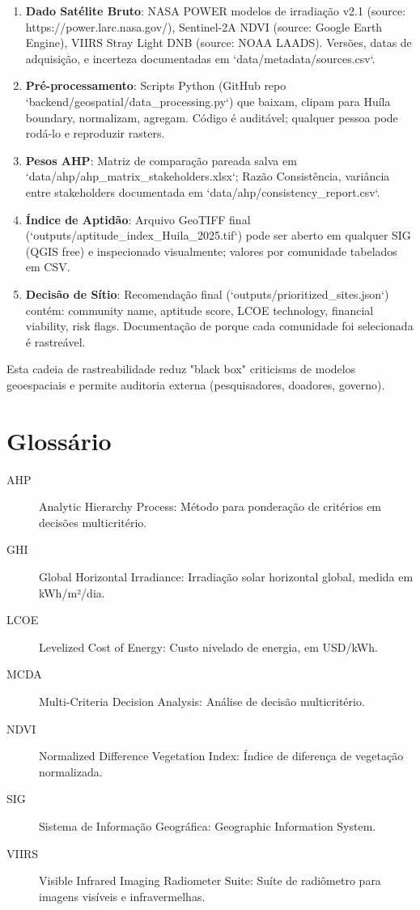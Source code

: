 \documentclass[12pt, a4paper]{article}
\begin{document}
\begin{enumerate}
\item \textbf{Dado Satélite Bruto}: NASA POWER modelos de irradiação v2.1 (source: https://power.larc.nasa.gov/), Sentinel-2A NDVI (source: Google Earth Engine), VIIRS Stray Light DNB (source: NOAA LAADS). Versões, datas de adquisição, e incerteza documentadas em `data/metadata/sources.csv`.

\item \textbf{Pré-processamento}: Scripts Python (GitHub repo `backend/geospatial/data_processing.py`) que baixam, clipam para Huíla boundary, normalizam, agregam. Código é auditável; qualquer pessoa pode rodá-lo e reproduzir rasters.

\item \textbf{Pesos AHP}: Matriz de comparação pareada salva em `data/ahp/ahp_matrix_stakeholders.xlsx`; Razão Consistência, variância entre stakeholders documentada em `data/ahp/consistency_report.csv`.

\item \textbf{Índice de Aptidão}: Arquivo GeoTIFF final (`outputs/aptitude_index_Huila_2025.tif`) pode ser aberto em qualquer SIG (QGIS free) e inspecionado visualmente; valores por comunidade tabelados em CSV.

\item \textbf{Decisão de Sítio}: Recomendação final (`outputs/prioritized_sites.json`) contém: community name, aptitude score, LCOE technology, financial viability, risk flags. Documentação de porque cada comunidade foi selecionada é rastreável.
\end{enumerate}

Esta cadeia de rastreabilidade reduz "black box" criticisms de modelos geoespaciais e permite auditoria externa (pesquisadores, doadores, governo).

\section*{Glossário}

\begin{description}
\item[AHP] Analytic Hierarchy Process: Método para ponderação de critérios em decisões multicritério.
\item[GHI] Global Horizontal Irradiance: Irradiação solar horizontal global, medida em kWh/m²/dia.
\item[LCOE] Levelized Cost of Energy: Custo nivelado de energia, em USD/kWh.
\item[MCDA] Multi-Criteria Decision Analysis: Análise de decisão multicritério.
\item[NDVI] Normalized Difference Vegetation Index: Índice de diferença de vegetação normalizada.
\item[SIG] Sistema de Informação Geográfica: Geographic Information System.
\item[VIIRS] Visible Infrared Imaging Radiometer Suite: Suíte de radiômetro para imagens visíveis e infravermelhas.
\end{description}

\clearpage
\end{document}
